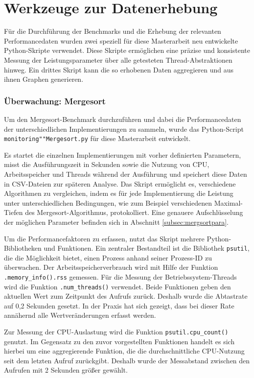 \documentclass[fontsize=12pt,paper=a4,twoside=semi,parskip=half-,headsepline,headinclude]{scrreprt}
\begin{document}
\section{Werkzeuge zur Datenerhebung}

Für die Durchführung der Benchmarks und die Erhebung der relevanten Performance\-daten wurden zwei speziell für diese Masterarbeit neu entwickelte Python-Skripte verwendet. Diese Skripte ermöglichen eine präzise und konsistente Messung der Leistungsparameter über alle getesteten Thread-Abstraktionen hinweg. Ein drittes Skript kann die so erhobenen Daten aggregieren und aus ihnen Graphen generieren.

\subsubsection{Überwachung: Mergesort}

Um den Mergesort-Benchmark durchzuführen und dabei die Performancedaten der unterschiedlichen Implementierungen zu sammeln, wurde das Python-Script \texttt{monitoring""Mergesort.py} für diese Masterarbeit entwickelt.

Es startet die einzelnen Implementierungen mit vorher definierten Parametern, misst die Ausführungszeit in Sekunden sowie die Nutzung von CPU, Arbeitsspeicher und Threads während der Ausführung und speichert diese Daten in CSV-Dateien zur späteren Analyse. Das Skript ermöglicht es, verschiedene Algorithmen zu vergleichen, indem es für jede Implementierung die Leistung unter unterschiedlichen Bedingungen, wie zum Beispiel verschiedenen Maximal-Tiefen des Mergesort-Algorithmus, protokolliert. Eine genauere Aufschlüsselung der möglichen Parameter befinden sich in Abschnitt \ref{subsec:mergsortpara}.

Um die Performancefaktoren zu erfassen, nutzt das Skript mehrere Python-Bibliotheken und Funktionen. Ein zentraler Bestandteil ist die Bibliothek \texttt{psutil}, die die Möglichkeit bietet, einen Prozess anhand seiner Prozess-ID zu überwachen. Der Arbeitsspeicherverbrauch wird mit Hilfe der Funktion \texttt{.memory\_info().rss} gemessen. Für die Messung der Betriebssystem-Threads wird die Funktion \texttt{.num\_threads()} verwendet. Beide Funktionen geben den aktuellen Wert zum Zeitpunkt des Aufrufs zurück. Deshalb wurde die Abtastrate auf 0,2 Sekunden gesetzt. In der Praxis hat sich gezeigt, dass bei dieser Rate annähernd alle Wertveränderungen erfasst werden.

Zur Messung der CPU-Auslastung wird die Funktion \texttt{psutil.cpu\_count()} genutzt. Im Gegensatz zu den zuvor vorgestellten Funktionen handelt es sich hierbei um eine aggregierende Funktion, die die durchschnittliche CPU-Nutzung seit dem letzten Aufruf zurückgibt. Deshalb wurde der Messabstand zwischen den Aufrufen mit 2 Sekunden größer gewählt.
\end{document}
